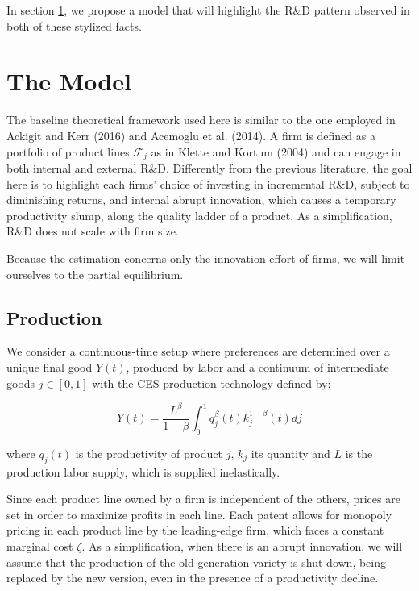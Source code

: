 \documentclass[letterpaper,12pt]{article}
\theoremstyle{definition}
\begin{document}
In section \ref{sec:Model}, we propose a model that will highlight the R\&D pattern observed in both of these stylized facts.

\section{The Model} \label{sec:Model}

The baseline theoretical framework used here is similar to the one employed in Ackigit and Kerr (2016) and Acemoglu et al. (2014). A firm is defined as a portfolio of product lines $\mathscr{F}_j$ as in Klette and Kortum (2004) and can engage in both internal and external R\&D. Differently from the previous literature, the goal here is to highlight each firms' choice of investing in incremental R\&D, subject to diminishing returns, and internal abrupt innovation, which causes a temporary productivity slump, along the quality ladder of a product. As a simplification, R\&D does not scale with firm size.

Because the estimation concerns only the innovation effort of firms, we will limit ourselves to the partial equilibrium.

\subsection{Production}

We consider a continuous-time setup where preferences are determined over a unique final good $Y(t)$, produced by labor and a continuum of intermediate goods $j \in [0,1]$ with the CES production technology defined by:

\begin{equation} \label{eq:Prod}
Y(t) =  \frac{L^{\beta}}{1 - \beta}\int_0^1 q_j^{\beta}(t)k_j^{1-\beta}(t)dj
\end{equation}

\noindent where $q_j(t)$ is the productivity of product $j$, $k_j$ its quantity and $L$ is the production labor supply, which is supplied inelastically. 

Since each product line owned by a firm is independent of the others, prices are set in order to maximize profits in each line. Each patent allows for monopoly pricing in each product line by the leading-edge firm, which faces a constant marginal cost $\zeta$. As a simplification, when there is an abrupt innovation, we will assume that the production of the old generation variety is shut-down, being replaced by the new version, even in the presence of a productivity decline.
\end{document}
